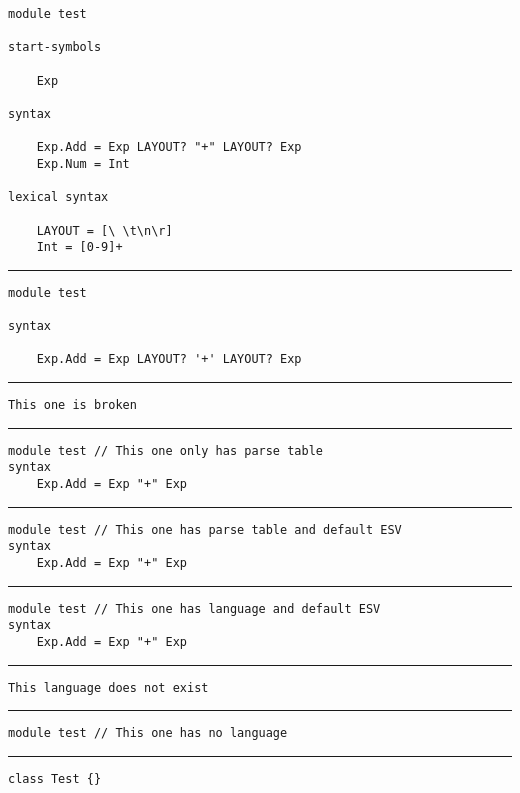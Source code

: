 \documentclass{minimal}
\newcommand{\separate}{\vspace{1em}\hrule\vspace{1em}}
\begin{document}
\begin{verbatim}
module test

start-symbols

    Exp

syntax

    Exp.Add = Exp LAYOUT? "+" LAYOUT? Exp
    Exp.Num = Int

lexical syntax

    LAYOUT = [\ \t\n\r]
    Int = [0-9]+
\end{verbatim}

\separate

\begin{verbatim}
module test

syntax

    Exp.Add = Exp LAYOUT? '+' LAYOUT? Exp
\end{verbatim}

\separate

\begin{verbatim}
This one is broken
\end{verbatim}

\separate

\begin{verbatim}
module test // This one only has parse table
syntax
    Exp.Add = Exp "+" Exp
\end{verbatim}

\separate

\begin{verbatim}
module test // This one has parse table and default ESV
syntax
    Exp.Add = Exp "+" Exp
\end{verbatim}

\separate

\begin{verbatim}
module test // This one has language and default ESV
syntax
    Exp.Add = Exp "+" Exp
\end{verbatim}

\separate

\begin{verbatim}
This language does not exist
\end{verbatim}

\separate

\begin{verbatim}
module test // This one has no language
\end{verbatim}

\separate

\begin{verbatim}
class Test {}
\end{verbatim}
\end{document}
